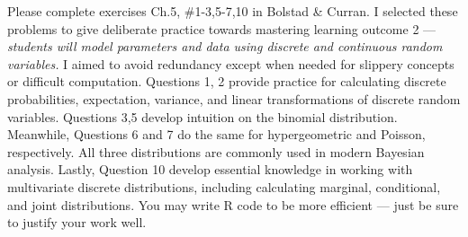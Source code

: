 \documentclass[11pt,article,landscape]{memoir}
\begin{document}
\maketitle

{\large Please complete exercises Ch.5, \#1-3,5-7,10 in Bolstad \& Curran. I selected these problems to give deliberate practice towards mastering learning outcome 2 --- \emph{students will model parameters and data using discrete and continuous random variables.} I aimed to avoid redundancy except when needed for slippery concepts or difficult computation. Questions 1, 2 provide practice for calculating discrete probabilities, expectation, variance, and linear transformations of discrete random variables. Questions 3,5 develop intuition on the binomial distribution. Meanwhile, Questions 6 and 7 do the same for hypergeometric and Poisson, respectively. All three distributions are commonly used in modern Bayesian analysis. Lastly, Question 10 develop essential knowledge in working with multivariate discrete distributions, including calculating marginal, conditional, and joint distributions. You may write R code to be more efficient --- just be sure to justify your work well.}
\end{document}
